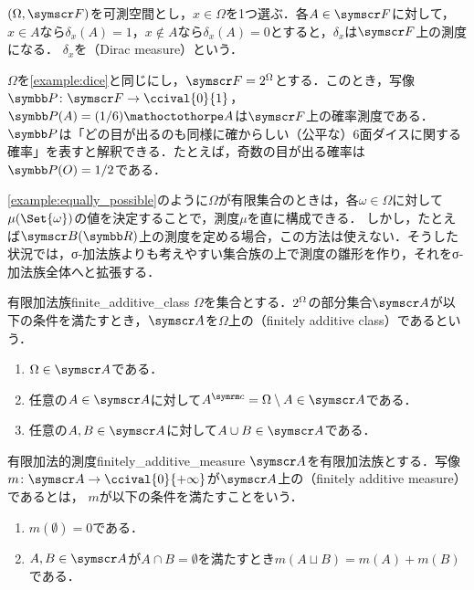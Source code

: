 \documentclass[../../main]{subfiles}
\begin{document}
\begin{example}[ディラック測度]
  \((\Omega,\sigmaalg{F})\)を可測空間とし，\(x\in\Omega\)を1つ選ぶ．各\(A\in\sigmaalg{F}\)に対して，\(x\in A\)なら\(\delta_x(A)=1\)，\(x\notin A\)なら\(\delta_x(A)=0\)とすると，\(\delta_x\)は\(\sigmaalg{F}\)上の測度になる．
  \(\delta_x\)を（Dirac measure）という．
\end{example}

\begin{example}\label{example:equally_possible}
  \(\Omega\)を\cref{example:dice}と同じにし，\(\sigmaalg{F}=\powerset{\Omega}\)とする．このとき，写像\(\prob\colon\sigmaalg{F}\to\ccival{0}{1}\)，\(\prob(A)=(1/6)\sizeof{A}\)は\(\sigmaalg{F}\)上の確率測度である．
  \(\prob\)は「どの目が出るのも同様に確からしい（公平な）6面ダイスに関する確率」を表すと解釈できる．たとえば，奇数の目が出る確率は\(\prob(O)=1/2\)である．
\end{example}

\cref{example:equally_possible}のように\(\Omega\)が有限集合のときは，各\(\omega\in\Omega\)に対して\(\mu(\Set{\omega})\)の値を決定することで，測度\(\mu\)を直に構成できる．
しかし，たとえば\(\sigmaalg{B}(\numset{R})\)上の測度を定める場合，この方法は使えない．そうした状況では，σ‐加法族よりも考えやすい集合族の上で測度の雛形を作り，それをσ‐加法族全体へと拡張する．

\begin{definition}{有限加法族}{finite_additive_class}
  \(\Omega\)を集合とする．\(2^{\Omega}\)の部分集合\(\sigmaalg{A}\)が以下の条件を満たすとき，\(\sigmaalg{A}\)を\(\Omega\)上の（finitely additive class）であるという．
  \begin{enumerate}
    \item \(\Omega\in\sigmaalg{A}\)である．
    \item 任意の\(A\in\sigmaalg{A}\)に対して\(\scomp{A}=\Omega\setminus A\in\sigmaalg{A}\)である．
    \item 任意の\(A,B\in\sigmaalg{A}\)に対して\(A\cup B\in\sigmaalg{A}\)である．
  \end{enumerate}
\end{definition}

\begin{definition}{有限加法的測度}{finitely_additive_measure}
  \(\sigmaalg{A}\)を有限加法族とする．写像\(m\colon\sigmaalg{A}\to\ccival{0}{+\infty}\)が\(\sigmaalg{A}\)上の（finitely additive measure）であるとは，
  \(m\)が以下の条件を満たすことをいう．
  \begin{enumerate}
    \item \(m(\emptyset)=0\)である．
    \item \(A,B\in\sigmaalg{A}\)が\(A\cap B=\emptyset\)を満たすとき\(m(A\sqcup B)=m(A)+m(B)\)である．
  \end{enumerate}
\end{definition}
\end{document}
